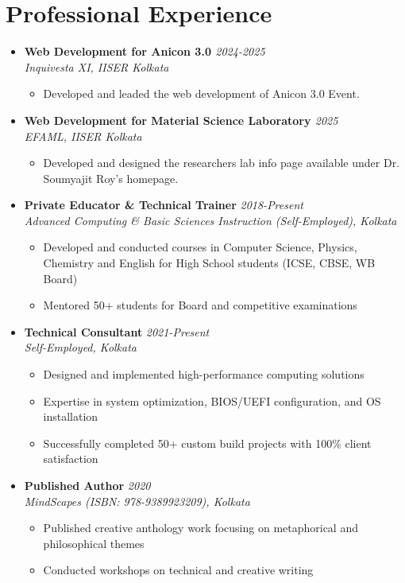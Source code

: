 \documentclass[a4paper,9pt]{article}
\newcommand{\resumeProject}[4]{
    \item\small{
        \textbf{#1} \hfill \textit{#2}\\
        \textit{#3}\\
        \begin{itemize}[leftmargin=1.5em,label=\textbullet,nosep,itemsep=0.5pt]
            #4
        \end{itemize}
    }\vspace{2pt}
}
\newcommand{\compactSection}[2]{
    \section{#1}
    \vspace{-0.1cm}
    #2
    \vspace{-0.2cm}
}
\begin{document}
\compactSection{Professional Experience}{
\begin{itemize}[leftmargin=*,label={},itemsep=4pt]

    \resumeProject{Web Development for Anicon 3.0 \href{https://anicon3.github.io/}{\faGlobe}}{2024-2025}
    {Inquivesta XI, IISER Kolkata}
    {\item Developed and leaded the web development of Anicon 3.0 Event. }

    \resumeProject{Web Development for Material Science Laboratory \href{https://shuvam-banerji-seal.github.io/EFAML_WEB/index.html}{\faGlobe}}{2025}
    {EFAML, IISER Kolkata}
    {\item Developed and designed the researchers lab info page available under Dr. Soumyajit Roy's homepage.}
     
    \resumeProject{Private Educator \& Technical Trainer}{2018-Present}
    {Advanced Computing \& Basic Sciences Instruction \textit{(Self-Employed)}, Kolkata}
    {\item Developed and conducted courses in Computer Science, Physics, Chemistry and English for High School students (ICSE, CBSE, WB Board)
    \item Mentored 50+ students for Board and competitive examinations}
     
    \resumeProject{Technical Consultant}{2021-Present}
    {Self-Employed, Kolkata}
    {\item Designed and implemented high-performance computing solutions
    \item Expertise in system optimization, BIOS/UEFI configuration, and OS installation
    \item Successfully completed 50+ custom build projects with 100\% client satisfaction}
     
    \resumeProject{Published Author}{2020}
    {MindScapes (ISBN: 978-9389923209), Kolkata}
    {\item Published creative anthology work focusing on metaphorical and philosophical themes
    \item Conducted workshops on technical and creative writing}
     
\end{itemize}
}
\end{document}
